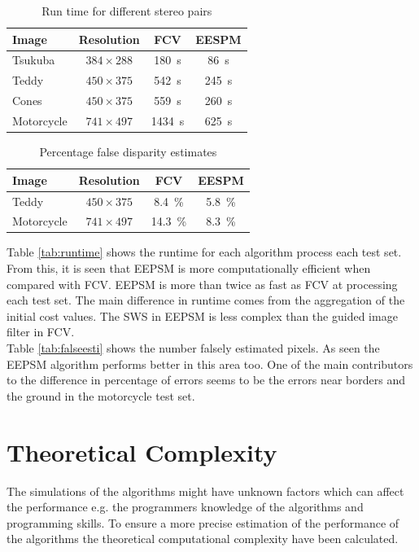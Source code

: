 \begin{table}[ht!]
  \centering
  \begin{tabular}{l c c c }
    \toprule
    Image & Resolution & FCV & EESPM\\
    \midrule
    Tsukuba & $384\times288$ & \SI{180}{\second} & \SI{86}{\second}\\
    Teddy & $450\times375$  & \SI{542}{\second} & \SI{245}{\second}\\
    Cones & $450\times375$  & \SI{559}{\second}& \SI{260}{\second} \\
    Motorcycle &  $741\times497$  & \SI{1434}{\second}& \SI{625}{\second}\\
    \bottomrule
  \end{tabular}
  \caption{Run time for different stereo pairs \label{tab:runtime}}
\end{table}

\begin{table}[ht!]
  \centering
  \begin{tabular}{l c c c }
    \toprule
    Image & Resolution & FCV & EESPM \\
    \midrule
    Teddy & $450\times375$ & \SI{8.4}{\percent} & \SI{5.8}{\percent} \\
    Motorcycle & $741\times497$ & \SI{14.3}{\percent} & \SI{8.3}{\percent}\\
    \bottomrule
  \end{tabular}
  \caption{Percentage false disparity estimates \label{tab:falseesti}}
\end{table}

Table \vref{tab:runtime} shows the runtime for each algorithm process each test set. From this, it is seen that EEPSM is more computationally efficient when compared with FCV. EEPSM is more than twice as fast as FCV at processing each test set. The main difference in runtime comes from the aggregation of the initial cost values. The SWS in EEPSM is less complex than the guided image filter in FCV.\\

Table \vref{tab:falseesti} shows the number falsely estimated pixels. As seen the EEPSM algorithm performs better in this area too. One of the main contributors to the difference in percentage of errors seems to be the errors near borders and the ground in the motorcycle test set.

\section{Theoretical Complexity} \label{sec:theorycomplex}
The simulations of the algorithms might have unknown factors which can affect the performance e.g. the programmers knowledge of the algorithms and programming skills. To ensure a more precise estimation of the performance of the algorithms the theoretical computational complexity have been calculated. \\

